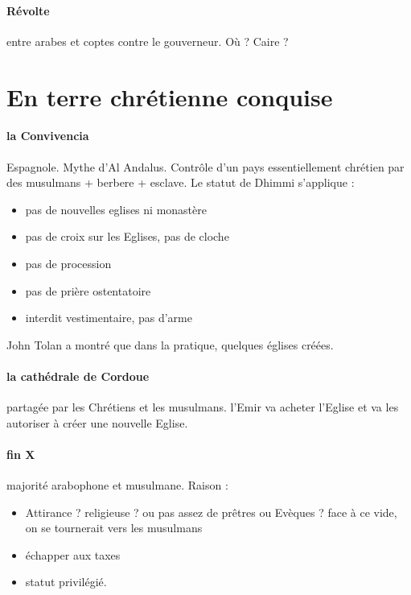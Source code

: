 \paragraph{Révolte} entre arabes et coptes contre le gouverneur.  Où ? Caire ? 





\section{En terre chrétienne conquise}


\paragraph{la Convivencia} Espagnole. Mythe d'Al Andalus. Contrôle d'un pays essentiellement chrétien par des musulmans + berbere + esclave. Le statut de Dhimmi s'applique : 
\begin{itemize}
    \item pas de nouvelles eglises ni monastère
    \item pas de croix sur les Eglises, pas de cloche
    \item pas de procession
    \item pas de prière ostentatoire
    \item interdit vestimentaire, pas d'arme
\end{itemize}

John Tolan a montré que dans la pratique, quelques églises créées.

\paragraph{la cathédrale de Cordoue} partagée par les Chrétiens et les musulmans. l'Emir va acheter l'Eglise et va les autoriser à créer une nouvelle Eglise. 

\paragraph{fin X} majorité arabophone et musulmane. Raison : 
\begin{itemize}
    \item Attirance ? religieuse ? ou pas assez de prêtres ou Evèques ? face à ce vide, on se tournerait vers les musulmans
    \item échapper aux taxes
    \item statut privilégié. 
\end{itemize}


